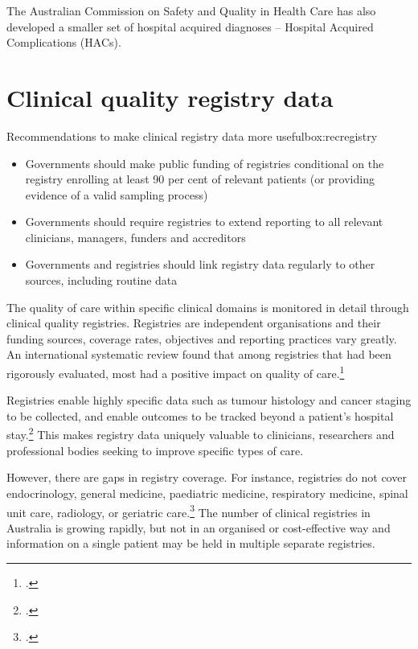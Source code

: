 \documentclass[FrontPage]{grattan}
\begin{document}
The Australian Commission on Safety and Quality in Health Care has also developed a smaller set of hospital acquired diagnoses -- Hospital Acquired Complications (HACs).



\section{Clinical quality registry data}\label{sec:registry}

\begin{addsmallbox}{Recommendations to make clinical registry data more useful}{box:recregistry}
\begin{itemize}[leftmargin=*]
    \item Governments should make public funding of registries conditional on the registry enrolling at least 90 per cent of relevant patients (or providing evidence of a valid sampling process)
    \item Governments should require registries to extend reporting to all relevant clinicians, managers, funders and accreditors
    \item Governments and registries should link registry data regularly to other sources, including routine data
\end{itemize}
\end{addsmallbox}

The quality of care within specific clinical domains is monitored in detail through clinical quality registries. Registries are independent organisations and their funding sources, coverage rates, objectives and reporting practices vary greatly. An international systematic review found that among registries that had been rigorously evaluated, most had a positive impact on quality of care.\footcites{RN28}

Registries enable highly specific data such as tumour histology and cancer staging to be collected, and enable outcomes to be tracked beyond a patient’s hospital stay.\footcite{RN29} This makes registry data uniquely valuable to clinicians, researchers and professional bodies seeking to improve specific types of care.

However, there are gaps in registry coverage. For instance, registries do not cover endocrinology, general medicine, paediatric medicine, respiratory medicine, spinal unit care, radiology, or geriatric care.\footcite{RN30} The number of clinical registries in Australia is growing rapidly, but not in an organised or cost-effective way and information on a single patient may be held in multiple separate registries.
\end{document}
